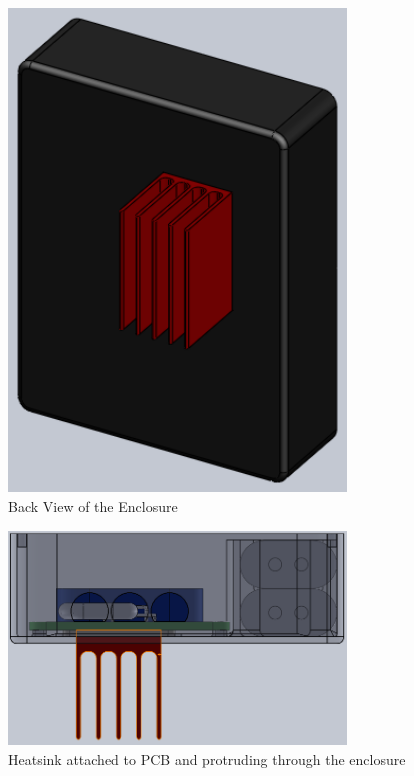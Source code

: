 \documentclass{article}
\numberwithin{figure}{section}
\numberwithin{equation}{section}
\begin{document}
{\begin{figure}[H]
	\centering
	\includegraphics[width=0.8\textwidth]{Assembly3}
	\caption{Back View of the Enclosure}
	\label{fig:append_enclosureback}
\end{figure}

\begin{figure}[H]
	\centering
	\includegraphics[width=0.8\textwidth]{Assembly4}
	\caption{Heatsink attached to PCB and protruding through the enclosure}
	\label{fig:append_heatsink}
\end{figure}

}
\end{document}
